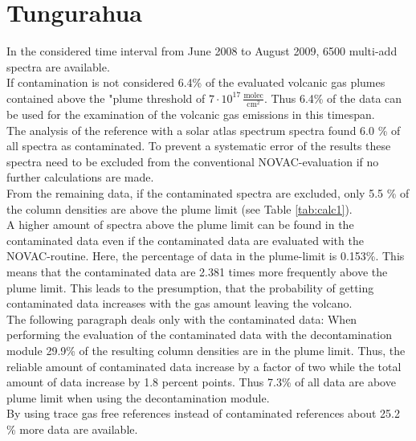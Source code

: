 \documentclass  [
  paper    = a4,
  BCOR     = 10mm,
  twoside,
  fontsize = 12pt,
  fleqn,
  toc      = bibnumbered,
  toc      = listofnumbered,
  numbers  = noendperiod,
  headings = normal,
  listof   = leveldown,
  version  = 3.03
]                                       {scrreprt}
\newcommand{\myrowcolour}{\rowcolor[gray]{0.925}}
\begin{document}


\section{Tungurahua}
In the considered time interval from June 2008 to August 2009, 6500 multi-add spectra are available. \\
If contamination is not considered
6.4\% of the evaluated volcanic gas plumes contained  above the "plume threshold of $7\cdot10^{17}\,\frac{\text{molec}}{\text{cm}^2}$. Thus 6.4\% of the data can be used for the examination of the volcanic gas emissions in this timespan.\\
The analysis of the reference with a solar atlas spectrum spectra found 6.0 \% of all spectra as contaminated. To prevent a systematic error of the results these spectra need to be excluded from the conventional NOVAC-evaluation if no further calculations are made.\\
From the remaining data,  if the contaminated spectra are excluded, only 5.5 \% of the   column densities are above the plume limit  (see  Table \ref{tab:calc1}). \\
A higher amount of spectra above the   plume limit can be found in the contaminated data even if the contaminated data are evaluated with the NOVAC-routine. Here, the percentage of data in the plume-limit is 0.153\%.
This means that the contaminated data are 2.381 times more frequently above the plume limit. This leads to the presumption, that the probability of getting contaminated data increases with the gas amount leaving the volcano.\\
The following paragraph deals only with the contaminated data:    
When performing the evaluation of the contaminated data with the decontamination module 29.9\% of the resulting   column densities are in the plume limit. Thus, the reliable amount of contaminated data increase by a factor of two while the total amount of data increase by 1.8 percent points. Thus 7.3\% of all data are above plume limit when using the decontamination module.\\
By using trace gas free references instead of contaminated references about 25.2 \% more data are available. \\
\end{document}
